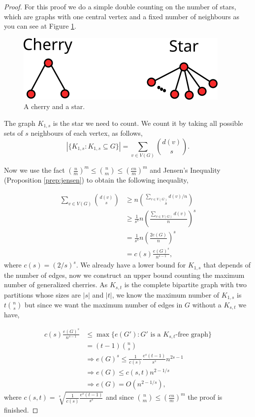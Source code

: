\documentclass[12pt,twoside,a4paper,bibliography=totocnumbered]{book}
\numberwithin{equation}{section}
\theoremstyle{remark}
\begin{document}
\begin{proof}

For this proof we do a simple double counting on the number of stars, which are graphs with one central vertex and a fixed number of neighbours as you can see at Figure \ref{fig:generalizedcherry}.

\begin{figure}[!htb]
     \centering
     \includegraphics[scale=1]{Figuras/cherry-and-star.png}
     \caption{A cherry and a star.}
     \label{fig:generalizedcherry}
\end{figure}

The graph $K_{1,s}$ is the star we need to count. We count it by taking all possible sets of $s$ neighbours of each vertex, as follows,
$$ |\{K_{1,s}\colon K_{1,s} \subseteq G\}| = \sum_{v \in V(G)} \binom{d(v)}{s} .$$

Now we use the fact $\left(\frac{n}{m}\right)^m \leq \binom{n}{m} \leq \left(\frac{en}{m}\right)^m$ and Jensen's Inequality (Proposition \ref{prep:jensen}) to obtain the following inequality,

\begin{align*} 
\sum_{v \in V(G)} \binom{d(v)}{s} & \geq n\binom{\sum_{v \in V(G)} d(v)/n}{s}\\ 
& \geq \frac{1}{s^s} n \left( \frac{\sum_{v \in V(G)} d(v)}{n} \right) ^s \\
& = \frac{1}{s^s} n \left( \frac{ 2 e(G)}{n} \right) ^s \\
& = c(s) \frac{e(G)^s}{n^{s-1}},
\end{align*}
where $c(s) = \left(2/s\right)^s$.
We already have a lower bound for $K_{1,s}$ that depends of the number of edges, now we construct an upper bound counting the maximum number of generalized cherries.
As $K_{s,t}$ is the complete bipartite graph with two partitions whose sizes are $|s|$ and $|t|$, we know the maximum number of $K_{1,s}$ is $t\binom{n}{s}$ but since we want the maximum number of edges in $G$ without a $K_{s,t}$ we have,

\begin{align*}
c(s) \frac{e(G)^s}{n^{s-1}} &\leq \max\{e(G')\colon G' \text{ is a } K_{s,t}\text{-free graph}\} \\
& = (t-1) \binom{n}{s}\\
		       & \Rightarrow e(G)^s \leq \frac{1}{c(s)}\frac{e^s(t-1)}{s^s}n^{2s-1}\\
		       &\Rightarrow e(G) \leq c(s,t) n^{2-1/s}\\
		       &\Rightarrow e(G) = O(n^{2-1/s}),
\end{align*}
where $c(s,t)= \sqrt[s]{\frac{1}{c(s)}\frac{e^s(t-1)}{s^s}}$ and since $\binom{n}{m} \leq \left(\frac{en}{m}\right)^m$ the proof is finished.
\end{proof}
\end{document}

